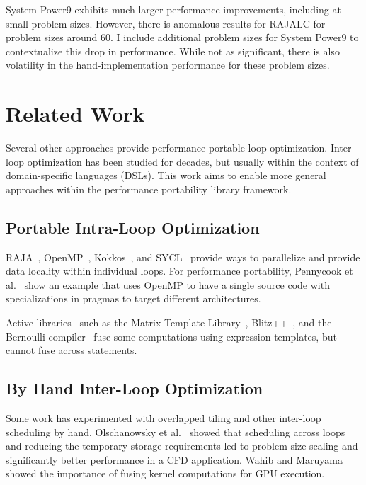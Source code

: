 System Power9 exhibits much larger performance improvements, including at small
problem sizes. 
However, there is anomalous results for RAJALC for problem sizes around 60. 
I include additional problem sizes for System Power9 to contextualize this drop in performance. 
While not as significant, there is also volatility in the hand-implementation performance for these problem sizes.

\section{Related Work}

Several other approaches provide performance-portable loop optimization.
Inter-loop optimization has been studied for decades, but usually
within the context of domain-specific languages (DSLs).
This work aims to enable more general approaches within the performance portability library framework.

\subsection{Portable Intra-Loop Optimization}
RAJA~\cite{RAJA}, OpenMP~\cite{OpenMPver5}, Kokkos~\cite{CarterEdwards2014},
and SYCL~\cite{SYCL2019} provide ways to parallelize and provide data locality
within individual loops.
For performance portability, Pennycook et al.~\cite{Pennycook2018} show an
example  that uses OpenMP to have a single source code with specializations
in pragmas to target different architectures.


Active libraries~\cite{VeldhuizenActive98} such as the 
Matrix Template Library~\cite{Siek:1999:SPM},
Blitz++~\cite{Veldhuizen2000},
and the Bernoulli compiler~\cite{Stodghill97,Ahmed2000} fuse some
computations using expression templates, but cannot fuse across statements.

\subsection{By Hand Inter-Loop Optimization}
Some work has experimented with overlapped tiling and other inter-loop
scheduling by hand.
Olschanowsky et al.~\cite{CathieSC14} showed that scheduling across loops and
reducing the temporary storage requirements led to problem size scaling and
significantly better performance in a CFD application.
Wahib and Maruyama~\cite{Wahib14} showed the importance of fusing kernel
computations for GPU execution.


